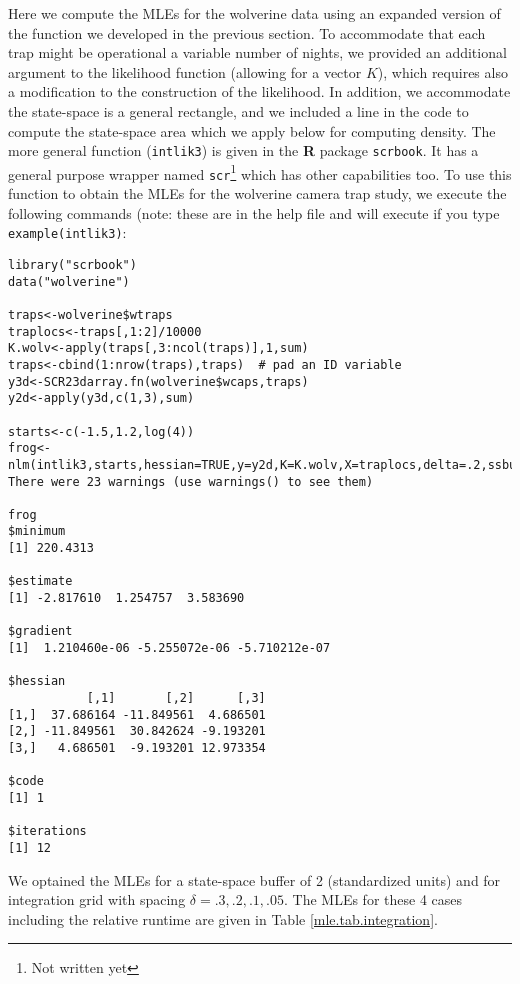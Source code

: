 Here we compute the MLEs for the wolverine data using an expanded
version of the function we developed in the previous section. To
accommodate that each trap might be operational a variable number of
nights, we provided an additional argument to the likelihood function
(allowing for a vector $K$), which requires also a modification to the
construction of the likelihood.  In addition,
we accommodate  the state-space is a general rectangle, and
we included a line in the code to compute the state-space area which
we apply below for computing density.  The more general function
(\mbox{\tt intlik3}) is given in the {\bf R} package \mbox{\tt scrbook}. It has a general
purpose wrapper named \mbox{\tt scr}\footnote{Not written yet} which has other capabilities too. 
To use this function to obtain the MLEs for the wolverine camera trap
study, we execute the following commands (note: these are in the help
file and will execute if you type \mbox{\tt example(intlik3)}:
{\small
\begin{verbatim}
library("scrbook")
data("wolverine")
 
traps<-wolverine$wtraps
traplocs<-traps[,1:2]/10000
K.wolv<-apply(traps[,3:ncol(traps)],1,sum)
traps<-cbind(1:nrow(traps),traps)  # pad an ID variable
y3d<-SCR23darray.fn(wolverine$wcaps,traps)
y2d<-apply(y3d,c(1,3),sum)

starts<-c(-1.5,1.2,log(4))
frog<-nlm(intlik3,starts,hessian=TRUE,y=y2d,K=K.wolv,X=traplocs,delta=.2,ssbuffer=2)
There were 23 warnings (use warnings() to see them)

frog
$minimum
[1] 220.4313

$estimate
[1] -2.817610  1.254757  3.583690

$gradient
[1]  1.210460e-06 -5.255072e-06 -5.710212e-07

$hessian
           [,1]       [,2]      [,3]
[1,]  37.686164 -11.849561  4.686501
[2,] -11.849561  30.842624 -9.193201
[3,]   4.686501  -9.193201 12.973354

$code
[1] 1

$iterations
[1] 12
\end{verbatim}
}


We optained the MLEs for a state-space buffer of 2 (standardized
units) and for integration grid with spacing $\delta = .3, .2, .1,
.05$. The MLEs for these 4 cases including the relative runtime are
given in Table \ref{mle.tab.integration}.

